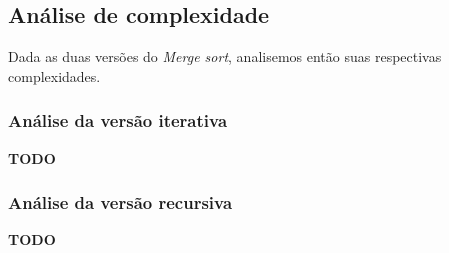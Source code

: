 \subsection{Análise de complexidade}

Dada as duas versões do \textit{Merge sort}, analisemos então suas respectivas complexidades.

\subsubsection{Análise da versão iterativa}

\textbf{TODO}

\subsubsection{Análise da versão recursiva}

\textbf{TODO}

